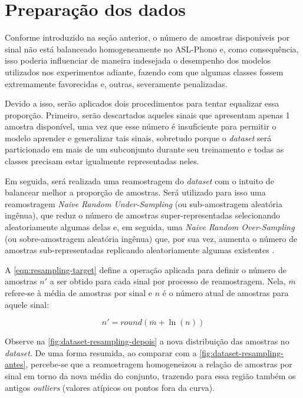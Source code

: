 \section{Preparação dos dados}
\label{sec:metodos-preparacao-dataset}


Conforme introduzido na seção anterior, o número de amostras disponíveis por sinal não está balanceado homogeneamente no ASL-Phono e, como consequência, isso poderia influenciar de maneira indesejada o desempenho dos modelos utilizados nos experimentos adiante, fazendo com que algumas classes fossem extremamente favorecidas e, outras, severamente penalizadas.

Devido a isso, serão aplicados dois procedimentos para tentar equalizar essa proporção. Primeiro, serão descartados aqueles sinais que apresentam apenas 1 amostra disponível, uma vez que esse número é insuficiente para permitir o modelo aprender e generalizar tais sinais, sobretudo porque o \textit{dataset} será particionado em mais de um subconjunto durante seu treinamento e todas as classes precisam estar igualmente representadas neles.

Em seguida, será realizada uma reamostragem do \textit{dataset} com o intuito de balancear melhor a proporção de amostras.
Será utilizado para isso uma reamostragem \textit{Naive Random Under-Sampling} (ou sub-amostragem aleatória ingênua), que reduz o número de amostras super-representadas selecionando aleatoriamente algumas delas e, em seguida, uma \textit{Naive Random Over-Sampling} (ou sobre-amostragem aleatória ingênua) que, por sua vez, aumenta o número de amostras sub-representadas replicando aleatoriamente algumas existentes \cite{he-2013-imbalanced}.

A \autoref{eqn:resampling-target} define a operação aplicada para definir o número de amostras \(n'\) a ser obtido para cada sinal por processo de reamostragem. Nela, \(\overline{m}\) refere-se à média de amostras por sinal e \(n\) é o número atual de amostras para aquele sinal:

\begin{equation}
    \label{eqn:resampling-target}
    n' = round( \overline{m} + \ln(n) )
\end{equation}

Observe na \autoref{fig:dataset-resampling-depois} a nova distribuição das amostras no \textit{dataset}. De uma forma resumida, ao comparar com a \autoref{fig:dataset-resampling-antes}, percebe-se que a reamostragem homogeneizou a relação de amostras por sinal em torno da nova média do conjunto, trazendo para essa região também os antigos \textit{outliers} (valores atípicos ou pontos fora da curva).


